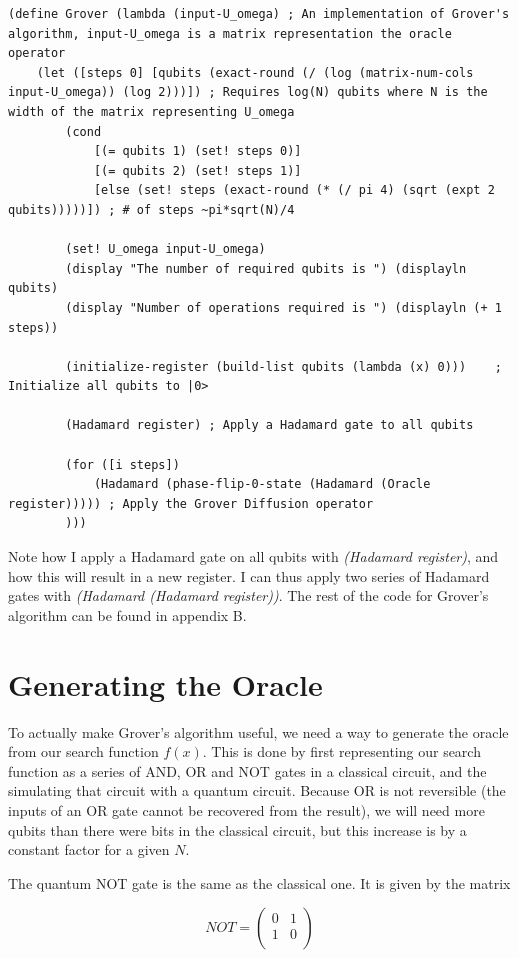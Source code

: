 \documentclass[11pt]{report}
\newcommand{\?}{\stackrel{?}{=}}
\begin{document}
\begin{verbatim}
(define Grover (lambda (input-U_omega) ; An implementation of Grover's algorithm, input-U_omega is a matrix representation the oracle operator
	(let ([steps 0] [qubits (exact-round (/ (log (matrix-num-cols input-U_omega)) (log 2)))]) ; Requires log(N) qubits where N is the width of the matrix representing U_omega
		(cond
			[(= qubits 1) (set! steps 0)]
			[(= qubits 2) (set! steps 1)]
			[else (set! steps (exact-round (* (/ pi 4) (sqrt (expt 2 qubits)))))]) ; # of steps ~pi*sqrt(N)/4

		(set! U_omega input-U_omega)
		(display "The number of required qubits is ") (displayln qubits)
		(display "Number of operations required is ") (displayln (+ 1 steps))

		(initialize-register (build-list qubits (lambda (x) 0)))	; Initialize all qubits to |0>

		(Hadamard register)	; Apply a Hadamard gate to all qubits

		(for ([i steps])
			(Hadamard (phase-flip-0-state (Hadamard (Oracle register))))) ; Apply the Grover Diffusion operator
		)))
\end{verbatim}

Note how I apply a Hadamard gate on all qubits with \textit{(Hadamard register)}, and how this will result in a new register. I can thus apply two series of Hadamard gates with \textit{(Hadamard (Hadamard register))}. The rest of the code for Grover's algorithm can be found in appendix B.

\section{Generating the Oracle}

To actually make Grover's algorithm useful, we need a way to generate the oracle from our search function $f(x)$. This is done by first representing our search function as a series of AND, OR and NOT gates in a classical circuit, and the simulating that circuit with a quantum circuit. Because OR is not reversible (the inputs of an OR gate cannot be recovered from the result), we will need more qubits than there were bits in the classical circuit, but this increase is by a constant factor for a given $N$.

The quantum NOT gate is the same as the classical one. It is given by the matrix

$$NOT= \begin{pmatrix}
0 & 1 \\
1 & 0 \\
\end{pmatrix}$$
\end{document}
